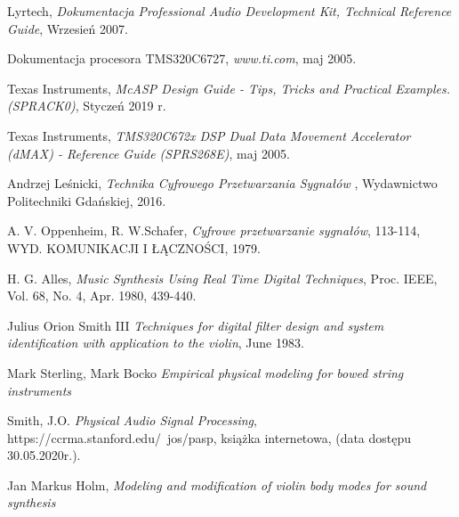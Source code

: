 \documentclass[nostrict]{szablonPG}
\begin{document}
\begin{thebibliography}{20}
		Lyrtech, \emph{Dokumentacja Professional Audio Development Kit, Technical Reference Guide}, Wrzesień 2007.
		
		Dokumentacja procesora TMS320C6727, \emph{www.ti.com}, maj 2005.
		
	    Texas Instruments, \emph{McASP Design Guide - Tips, Tricks and Practical Examples. (SPRACK0)}, Styczeń 2019 r.
		
		Texas Instruments, \emph{TMS320C672x DSP Dual Data Movement Accelerator (dMAX) - Reference Guide (SPRS268E)}, maj 2005.
		
		Andrzej Le\'snicki, \emph{Technika Cyfrowego Przetwarzania Sygna\l{}\'ow }, Wydawnictwo Politechniki Gda\'nskiej, 2016.
		
		A. V. Oppenheim, R. W.Schafer, \emph{Cyfrowe przetwarzanie sygnałów}, 113-114, WYD. KOMUNIKACJI I ŁĄCZNOŚCI, 1979.
		
		 H. G. Alles, \emph{Music Synthesis Using Real Time Digital Techniques}, Proc. IEEE, Vol. 68, No. 4, Apr. 1980, 439-440.

		Julius Orion Smith III \emph{Techniques for digital filter design and system identification with application to the violin}, June 1983.
		
		Mark Sterling, Mark Bocko \emph{Empirical physical modeling for bowed string instruments}
		
		Smith, J.O. \emph{Physical Audio Signal Processing}, https://ccrma.stanford.edu/~jos/pasp, książka internetowa, (data dostępu 30.05.2020r.).
		
		Jan Markus Holm, \emph{Modeling and modification of violin body modes for sound synthesis}
			
	\end{thebibliography}
	
\end{document}
